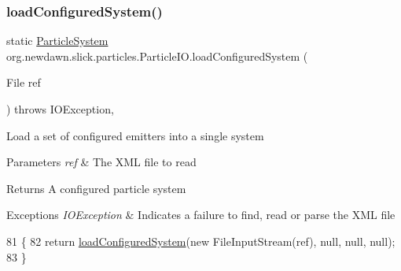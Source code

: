 \subsubsection{\texorpdfstring{load\+Configured\+System()}{loadConfiguredSystem()}\hspace{0.1cm}{\footnotesize\ttfamily [3/9]}}
{\footnotesize\ttfamily static \mbox{\hyperlink{classorg_1_1newdawn_1_1slick_1_1particles_1_1_particle_system}{Particle\+System}} org.\+newdawn.\+slick.\+particles.\+Particle\+I\+O.\+load\+Configured\+System (\begin{DoxyParamCaption}\item[{File}]{ref }\end{DoxyParamCaption}) throws I\+O\+Exception\hspace{0.3cm}{\ttfamily [inline]}, {\ttfamily [static]}}

Load a set of configured emitters into a single system


\begin{DoxyParams}{Parameters}
{\em ref} & The X\+ML file to read \\
\hline
\end{DoxyParams}
\begin{DoxyReturn}{Returns}
A configured particle system 
\end{DoxyReturn}

\begin{DoxyExceptions}{Exceptions}
{\em I\+O\+Exception} & Indicates a failure to find, read or parse the X\+ML file \\
\hline
\end{DoxyExceptions}

\begin{DoxyCode}
81                                \{
82       \textcolor{keywordflow}{return} \mbox{\hyperlink{classorg_1_1newdawn_1_1slick_1_1particles_1_1_particle_i_o_a1da2bcc8784c9cf967326954bc3c9d33}{loadConfiguredSystem}}(\textcolor{keyword}{new} FileInputStream(ref), null, null, null);
83     \}
\end{DoxyCode}
\mbox{\label{classorg_1_1newdawn_1_1slick_1_1particles_1_1_particle_i_o_abe9bfde54b8f6ba013afbe3b98b3ee0d}} 

